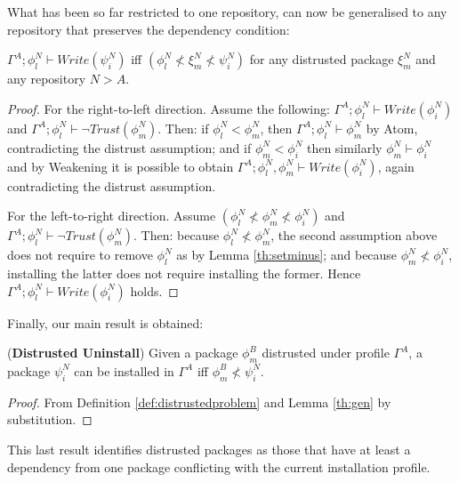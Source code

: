 \documentclass[]{llncs}
\begin{document}
What has been so far restricted to one repository, can now be generalised to any repository that preserves the dependency condition:


\begin{lemma}\label{th:gen}
	$\Gamma^{A};\phi_{l}^{N}\vdash Write(\psi_{i}^{N})$ iff $(\phi_{l}^{N}\nless \xi_{m}^{N} \nless \psi^{N}_{i})$  for any distrusted package $\xi_{m}^{N}$ and any repository $N> A$.
\end{lemma}

\begin{proof}
	For the right-to-left direction. Assume the following: $\Gamma^{A};\phi_{l}^{N}\vdash Write(\phi_{i}^{N})$ and $\Gamma^{A};\phi_{l}^{N}\vdash \neg Trust(\phi^{N}_{m})$. Then: if $\phi^{N}_{l}< \phi^{N}_{m}$, then $\Gamma^{A}; \phi^{N}_{l}\vdash \phi^{N}_{m}$ by Atom, contradicting the distrust assumption; and if $\phi^{N}_{m}< \phi^{N}_{i}$ then similarly $\phi^{N}_{m}\vdash \phi^{N}_{i}$ and by Weakening it is possible to obtain $\Gamma^{A};\phi_{l}^{N},\phi^{N}_{m} \vdash Write(\phi_{i}^{N})$, again contradicting the distrust assumption.

	For the left-to-right direction. Assume $(\phi_{l}^{N}\nless \phi_{m}^{N} \nless \phi^{N}_{i})$ and $\Gamma^{A};\phi_{l}^{N}\vdash \neg Trust(\phi^{N}_{m})$. Then: because $\phi_{l}^{N}\nless \phi_{m}^{N}$, the second assumption above does not require to remove $\phi_{l}^{N}$ as by Lemma \ref{th:setminus}; and because $\phi_{m}^{N} \nless \phi^{N}_{i}$, installing the latter does not require installing the former.
	Hence $\Gamma^{A};\phi_{l}^{N}\vdash Write(\phi_{i}^{N})$ holds.
\end{proof}

Finally, our main result is obtained:

\begin{theorem}(\textbf{Distrusted Uninstall})
	Given a package $\phi^{B}_{m}$ distrusted under profile $\Gamma^{A}$, a package $\psi^{N}_{i}$ can be installed in $\Gamma^{A}$ iff $\phi^{B}_{m}\nless \psi^{N}_{i}$.
\end{theorem}

\begin{proof}
	From Definition \ref{def:distrustedproblem} and Lemma \ref{th:gen} by substitution.
\end{proof}

This last result identifies distrusted packages as those that have at least a dependency from one package conflicting with the current installation profile.
\end{document}
